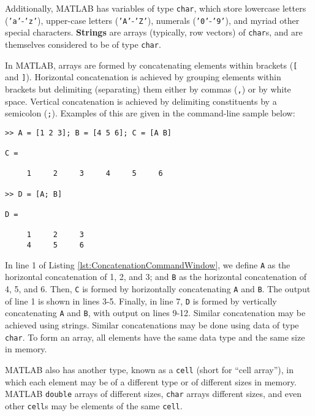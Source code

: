 Additionally, MATLAB has variables of type \texttt{char}, which store lowercase letters (\texttt{'a'}-\texttt{'z'}), upper-case letters (\texttt{'A'}-\texttt{'Z'}), numerals (\texttt{'0'}-\texttt{'9'}), and myriad other special characters. \textbf{Strings} are arrays (typically, row vectors) of \texttt{char}s, and are themselves considered to be of type \texttt{char}.

 In MATLAB, arrays are formed by concatenating elements within brackets (\texttt{[} and \texttt{]}). Horizontal concatenation is achieved by grouping elements within brackets but delimiting (separating) them either by commas (\texttt{,}) or by white space. Vertical concatenation is achieved by delimiting constituents by a semicolon (\texttt{;}). Examples of this are given in the command-line sample below:
\begin{lstlisting}[style=Matlab-editor, caption={The Command Window input and output demonstrates horizontal concatenation and vertical concatenation. Concatenation is accomplished using brackets \texttt{[} and \texttt{]}. Elements of a horizontal concatenation are separated by whites space or commas (\texttt{,}); and elements of a vertical concatenation are specified using a semicolon (\texttt{;}).}, label={lst:ConcatenationCommandWindow}]
 >> A = [1 2 3]; B = [4 5 6]; C = [A B]

C =

     1     2     3     4     5     6

>> D = [A; B]

D =

     1     2     3
     4     5     6
\end{lstlisting}
In line 1 of Listing \ref{lst:ConcatenationCommandWindow}, we define \texttt{A} as the horizontal concatenation of 1, 2, and 3; and \texttt{B} as the horizontal concatenation of 4, 5, and 6. Then, \texttt{C} is formed by horizontally concatenating \texttt{A} and \texttt{B}. The output of line 1 is shown in lines 3-5. Finally, in line 7, \texttt{D} is formed by vertically concatenating \texttt{A} and \texttt{B}, with output on lines 9-12. Similar concatenation may be achieved using strings. Similar concatenations may be done using data of type \texttt{char}. To form an array, all elements have the same data type and the same size in memory.

MATLAB also has another type, known as a \texttt{cell} (short for ``cell array''), in which each element may be of a different type or of different sizes in memory. MATLAB \texttt{double} arrays of different sizes, \texttt{char} arrays different sizes, and even other \texttt{cell}s may be elements of the same \texttt{cell}.

